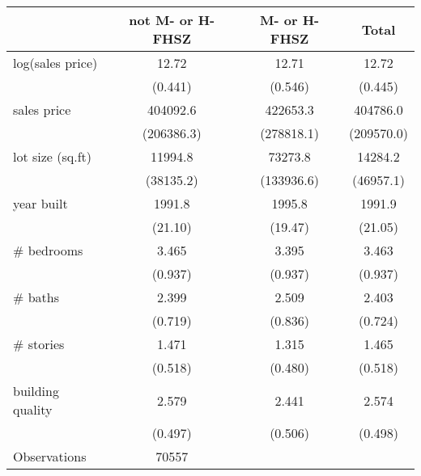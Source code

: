 \begin{tabular}{l*{3}{c}}
\hline\hline
                    &not M- or H-FHSZ&M- or H-FHSZ&       Total\\
\hline
log(sales price)    &       12.72&       12.71&       12.72\\
                    &     (0.441)&     (0.546)&     (0.445)\\
[1em]
sales price         &    404092.6&    422653.3&    404786.0\\
                    &  (206386.3)&  (278818.1)&  (209570.0)\\
[1em]
lot size (sq.ft)    &     11994.8&     73273.8&     14284.2\\
                    &   (38135.2)&  (133936.6)&   (46957.1)\\
[1em]
year built          &      1991.8&      1995.8&      1991.9\\
                    &     (21.10)&     (19.47)&     (21.05)\\
[1em]
\# bedrooms         &       3.465&       3.395&       3.463\\
                    &     (0.937)&     (0.937)&     (0.937)\\
[1em]
\# baths            &       2.399&       2.509&       2.403\\
                    &     (0.719)&     (0.836)&     (0.724)\\
[1em]
\# stories          &       1.471&       1.315&       1.465\\
                    &     (0.518)&     (0.480)&     (0.518)\\
[1em]
building quality    &       2.579&       2.441&       2.574\\
                    &     (0.497)&     (0.506)&     (0.498)\\
\hline
Observations        &       70557&            &            \\
\hline\hline
\end{tabular}
